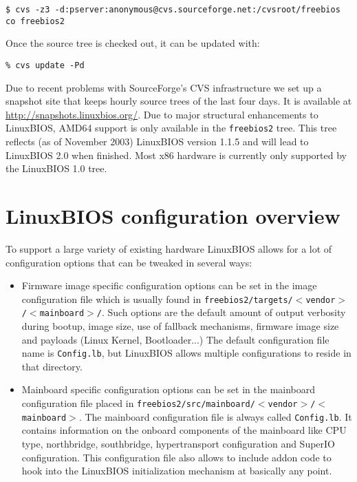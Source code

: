 \documentclass[titlepage,12pt]{article}
\begin{document}
{ \small
\begin{verbatim}
$ cvs -z3 -d:pserver:anonymous@cvs.sourceforge.net:/cvsroot/freebios co freebios2
\end{verbatim}
}

Once the source tree is checked out, it can be updated with:

{ \small
\begin{verbatim}
% cvs update -Pd
\end{verbatim}
}

Due to recent problems with SourceForge's CVS infrastructure we set up a
snapshot site that keeps hourly source trees of the last four days. It
is available at \url{http://snapshots.linuxbios.org/}.
Due to major structural enhancements to \hbox{LinuxBIOS}, AMD64 support
is only available in the \texttt{freebios2} tree. This tree reflects (as
of November 2003) LinuxBIOS version 1.1.5 and will lead to LinuxBIOS 2.0
when finished.  Most x86 hardware is currently only supported by the 
LinuxBIOS 1.0 tree.

%
%

\section{LinuxBIOS configuration overview}
To support a large variety of existing hardware LinuxBIOS allows for a
lot of configuration options that can be tweaked in several ways:

\begin{itemize}
\item 
Firmware image specific configuration options can be set in the image
configuration file which is usually found in
\texttt{freebios2/targets/$<$vendor$>$/$<$mainboard$>$/}.  Such
options are the default amount of output verbosity during bootup, image
size, use of fallback mechanisms, firmware image size and payloads
(Linux Kernel, Bootloader...) The default configuration file name is
\texttt{Config.lb}, but LinuxBIOS allows multiple configurations to
reside in that directory.

\item Mainboard specific configuration options can be set in the
mainboard configuration file placed in
\texttt{freebios2/src/mainboard/$<$vendor$>$/$<$mainboard$>$}. The
mainboard configuration file is always called \texttt{Config.lb}. It
contains information on the onboard components of the mainboard like
CPU type, northbridge, southbridge, hypertransport configuration and
SuperIO configuration.  This configuration file also allows to include
addon code to hook into the LinuxBIOS initialization mechanism at
basically any point.

\end{itemize}
\end{document}
